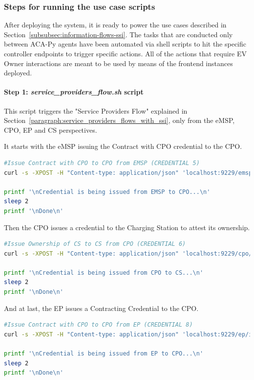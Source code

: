 \subsubsection{Steps for running the use case scripts}
\label{subsubsec:steps_for_running_the_use_case_scripts}

After deploying the system, it is ready to power the use cases described in Section~\ref{subsubsec:information-flows-ssi}. The tasks that are conducted only between ACA-Py agents have been automated via shell scripts to hit the specific controller endpoints to trigger specific actions. All of the actions that require EV Owner interactions are meant to be used by means of the frontend instances deployed.

\paragraph{Step 1: \textit{service\_providers\_flow.sh} script}

This script triggers the "Service Providers Flow" explained in Section~\ref{paragraph:service_providers_flows_with_ssi}, only from the eMSP, CPO, EP and CS perspectives.

It starts with the eMSP issuing the Contract with CPO credential to the CPO.

\begin{lstlisting}[language=bash]
#Issue Contract with CPO to CPO from EMSP (CREDENTIAL 5)
curl -s -XPOST -H "Content-type: application/json" 'localhost:9229/emsp/issue-credential/cpo' > /tmp/output.html

printf '\nCredential is being issued from EMSP to CPO...\n'
sleep 2
printf '\nDone\n'
\end{lstlisting}

Then the CPO issues a credential to the Charging Station to attest its ownership.

\begin{lstlisting}[language=bash]
#Issue Ownership of CS to CS from CPO (CREDENTIAL 6)
curl -s -XPOST -H "Content-type: application/json" 'localhost:9229/cpo/issue-credential/ownership-cs' > /tmp/output.html

printf '\nCredential is being issued from CPO to CS...\n'
sleep 2
printf '\nDone\n'
\end{lstlisting}

And at last, the EP issues a Contracting Credential to the CPO.

\begin{lstlisting}[language=bash]
#Issue Contract with CPO to CPO from EP (CREDENTIAL 8)
curl -s -XPOST -H "Content-type: application/json" 'localhost:9229/ep/issue-credential/contract-cpo' > /tmp/output.html

printf '\nCredential is being issued from EP to CPO...\n'
sleep 2
printf '\nDone\n'
\end{lstlisting}

